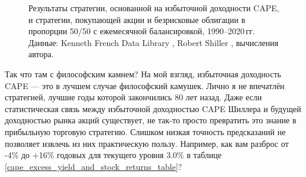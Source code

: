\begin{figure}[bt]
\centering
{}
\caption{Результаты стратегии, основанной на избыточной доходности CAPE, и 
стратегии, покупающей акции и безрисковые облигации в пропорции 50/50 с 
ежемесячной балансировкой, 1990--2020\,гг. Данные: Kenneth French Data Library 
\cite{kennethFrench}, Robert Shiller \cite{shillerOnline}, вычисления автора.}
\label{cape_strategy_1990}
\end{figure}

Так что там с философским камнем? На мой взгляд, избыточная доходность 
CAPE --- это в лучшем случае философский камушек. Лично я не впечатлён 
стратегией, лучшие годы которой закончились 80 лет назад. Даже если 
статистическая связь между избыточной доходностью CAPE Шиллера и будущей 
доходностью рынка акций существует, не так-то просто превратить это знание 
в прибыльную торговую стратегию. Слишком низкая точность предсказаний 
не позволяет извлечь из них практическую пользу. Например, как вам разброс от 
-4\% до +16\% годовых для текущего уровня 3.0\% в таблице 
\ref{cape_excess_yield_and_stock_returns_table}?

